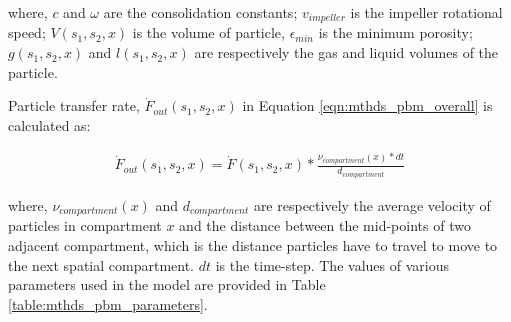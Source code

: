 \documentclass[preprint,11pt,authoryear]{elsarticle}
\begin{document}
 where, $c$ and $\omega$ are the consolidation constants; $v_{impeller}$ is the impeller 
rotational speed; $V(s_1,s_2,x)$ is the volume of particle, $\epsilon_{min}$ is the minimum porosity; 
$g(s_1,s_2,x)$ and $l(s_1,s_2,x)$ are respectively the gas and liquid volumes of the particle.

 Particle transfer rate, $\dot{F}_{out}(s_1,s_2,x)$ in Equation \ref{eqn:mthds_pbm_overall} is calculated 
as:

\begin{align}
\dot{F}_{out}(s_1,s_2,x) = \dot{F}(s_1,s_2,x)*\frac{\nu_{compartment}(x)*dt}{d_{compartment}}
\end{align}

where, $\nu_{compartment}(x)$ and $d_{compartment}$ are respectively the average velocity of 
particles in compartment $x$ and the distance between the mid-points of two adjacent compartment, 
which is the distance particles have to travel to move to the next spatial compartment. $dt$ is the 
time-step.
The values of various parameters used in the model are provided in Table 
\ref{table:mthds_pbm_parameters}.
\end{document}
